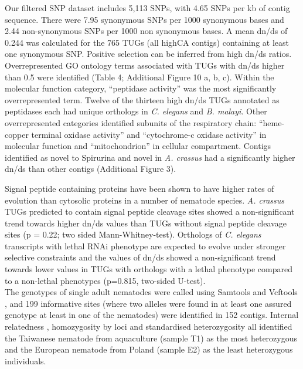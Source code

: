 \documentclass[10pt]{bmc_article}
\newenvironment{bmcformat}{\begin{raggedright}\baselineskip20pt\sloppy\setboolean{publ}{false}}{\end{raggedright}\baselineskip20pt\sloppy}
\begin{document}
\begin{bmcformat}
Our filtered SNP dataset includes 5,113 SNPs, with 4.65 SNPs per kb of
contig sequence. There were 7.95 synonymous SNPs per 1000 synonymous
bases and 2.44 non-synonymous SNPs per 1000 non synonymous bases. A
mean dn/ds of 0.244 was calculated for the 765 TUGs (all highCA
contigs) containing at least one synonymous SNP. Positive selection
can be inferred from high dn/ds ratios. Overrepresented GO ontology
terms associated with TUGs with dn/ds higher than 0.5 were identified
(Table 4; Additional Figure 10 a, b, c). Within the molecular function
category, ``peptidase activity'' was the most significantly
overrepresented term. Twelve of the thirteen high dn/ds TUGs annotated
as peptidases each had unique orthologs in \textit{C. elegans} and
\textit{B. malayi}. Other overrepresented categories identified
subunits of the respiratory chain: ``heme-copper terminal oxidase
activity'' and ``cytochrome-c oxidase activity'' in molecular function
and ``mitochondrion'' in cellular compartment. Contigs identified as
novel to Spirurina and novel in \textit{A. crassus} had a
significantly higher dn/ds than other contigs (Additional Figure 3).

Signal peptide containing proteins have been shown to have higher
rates of evolution than cytosolic proteins in a number of nematode
species. \textit{A. crassus} TUGs predicted to contain signal peptide
cleavage sites showed a non-significant trend towards higher dn/ds
values than TUGs without signal peptide cleavage sites (p =
0.22; two sided
Mann-Whitney-test). Orthologs of \textit{C. elegans} transcripts with
lethal RNAi phenotype are expected to evolve under stronger selective
constraints and the values of dn/ds showed a non-significant trend
towards lower values in TUGs with orthologs with a lethal phenotype
compared to a non-lethal phenotypes
(p=0.815, two-sided U-test).\\

The genotypes of single adult nematodes were called using Samtools
\cite{journals/bioinformatics/LiHWFRHMAD09} and Vcftools
\cite{pmid21653522}, and 199 informative sites (where
two alleles were found in at least one assured genotype at least in
one of the nematodes) were identified in 152
contigs. Internal relatedness \cite{pmid11571049}, homozygosity by
loci \cite{pmid17107491} and standardised heterozygosity
\cite{coltman81j} all identified the Taiwanese nematode from
aquaculture (sample T1) as the most heterozygous and the European
nematode from Poland (sample E2) as the least heterozygous
individuals.


\end{bmcformat}
\end{document}
